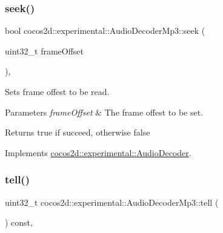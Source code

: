 \mbox{\label{classcocos2d_1_1experimental_1_1AudioDecoderMp3_a997804dcef5a632730f0efea296374f2}} 
\subsubsection{\texorpdfstring{seek()}{seek()}}
{\footnotesize\ttfamily bool cocos2d\+::experimental\+::\+Audio\+Decoder\+Mp3\+::seek (\begin{DoxyParamCaption}\item[{uint32\+\_\+t}]{frame\+Offset }\end{DoxyParamCaption})\hspace{0.3cm}{\ttfamily [override]}, {\ttfamily [virtual]}}



Sets frame offest to be read. 


\begin{DoxyParams}{Parameters}
{\em frame\+Offset} & The frame offest to be set. \\
\hline
\end{DoxyParams}
\begin{DoxyReturn}{Returns}
true if succeed, otherwise false 
\end{DoxyReturn}


Implements \hyperlink{classcocos2d_1_1experimental_1_1AudioDecoder_a290db97d8d4b00b6d09e145cd123b58b}{cocos2d\+::experimental\+::\+Audio\+Decoder}.

\mbox{\label{classcocos2d_1_1experimental_1_1AudioDecoderMp3_adf8e9914377f0cca2fa45a5741bb20bf}} 
\subsubsection{\texorpdfstring{tell()}{tell()}}
{\footnotesize\ttfamily uint32\+\_\+t cocos2d\+::experimental\+::\+Audio\+Decoder\+Mp3\+::tell (\begin{DoxyParamCaption}{ }\end{DoxyParamCaption}) const\hspace{0.3cm}{\ttfamily [override]}, {\ttfamily [virtual]}}



